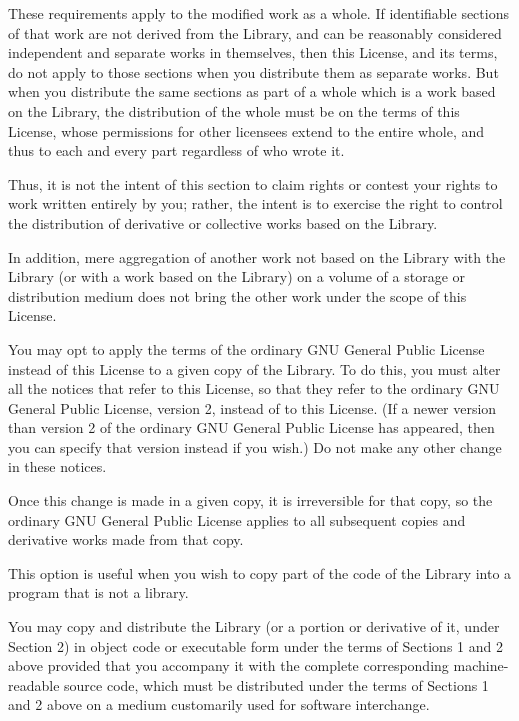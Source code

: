 These requirements apply to the modified work as a whole. If identifiable sections of that work are not derived from the Library, and can be reasonably considered independent and separate works in themselves, then this License, and its terms, do not apply to those sections when you distribute them as separate works. But when you distribute the same sections as part of a whole which is a work based on the Library, the distribution of the whole must be on the terms of this License, whose permissions for other licensees extend to the entire whole, and thus to each and every part regardless of who wrote it.

Thus, it is not the intent of this section to claim rights or contest your rights to work written entirely by you; rather, the intent is to exercise the right to control the distribution of derivative or collective works based on the Library.

In addition, mere aggregation of another work not based on the Library with the Library (or with a work based on the Library) on a volume of a storage or distribution medium does not bring the other work under the scope of this License.


\begin{DoxyEnumerate}
\item You may opt to apply the terms of the ordinary GNU General Public License instead of this License to a given copy of the Library. To do this, you must alter all the notices that refer to this License, so that they refer to the ordinary GNU General Public License, version 2, instead of to this License. (If a newer version than version 2 of the ordinary GNU General Public License has appeared, then you can specify that version instead if you wish.) Do not make any other change in these notices.
\end{DoxyEnumerate}

Once this change is made in a given copy, it is irreversible for that copy, so the ordinary GNU General Public License applies to all subsequent copies and derivative works made from that copy.

This option is useful when you wish to copy part of the code of the Library into a program that is not a library.


\begin{DoxyEnumerate}
\item You may copy and distribute the Library (or a portion or derivative of it, under Section 2) in object code or executable form under the terms of Sections 1 and 2 above provided that you accompany it with the complete corresponding machine-\/readable source code, which must be distributed under the terms of Sections 1 and 2 above on a medium customarily used for software interchange.
\end{DoxyEnumerate}

